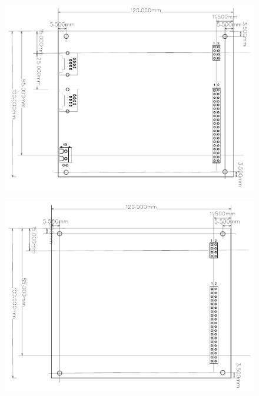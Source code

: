 \begin{figure}[ht]
    \centering
    \includegraphics[page=1, width=\textwidth]{./figures/LCS-FP-MAIN-CTRL-40-10X12.pdf}
\end{figure}

\FloatBarrier

\begin{figure}[ht]
    \centering
    \includegraphics[page=1, width=\textwidth]{./figures/LCS-FP-EXT-R-40-10X12.pdf}
\end{figure}

\FloatBarrier

